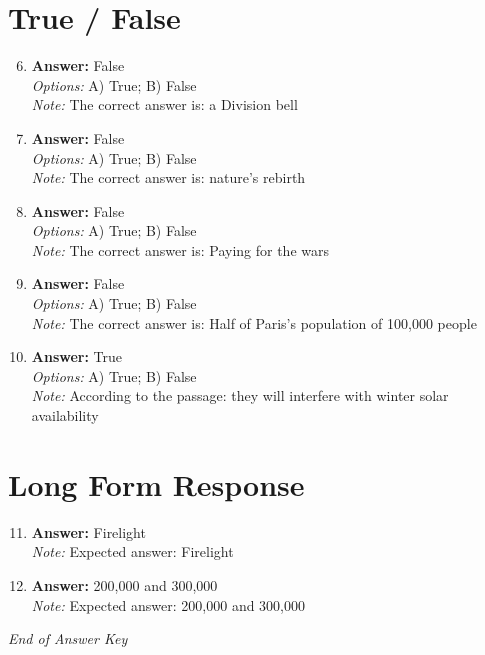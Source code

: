 \documentclass[12pt]{article}
\begin{document}
\section*{True / False}
\begin{enumerate}[label=\arabic*.]
\setcounter{enumi}{5}
\item \textbf{Answer:} False
\\ \textit{Options:} A) True; B) False
\\ \textit{Note:} The correct answer is: a Division bell
\item \textbf{Answer:} False
\\ \textit{Options:} A) True; B) False
\\ \textit{Note:} The correct answer is: nature's rebirth
\item \textbf{Answer:} False
\\ \textit{Options:} A) True; B) False
\\ \textit{Note:} The correct answer is: Paying for the wars
\item \textbf{Answer:} False
\\ \textit{Options:} A) True; B) False
\\ \textit{Note:} The correct answer is: Half of Paris's population of 100,000 people
\item \textbf{Answer:} True
\\ \textit{Options:} A) True; B) False
\\ \textit{Note:} According to the passage: they will interfere with winter solar availability
\end{enumerate}

\section*{Long Form Response}
\begin{enumerate}[label=\arabic*.]
\setcounter{enumi}{10}
\item \textbf{Answer:} Firelight
\\ \textit{Note:} Expected answer: Firelight
\item \textbf{Answer:} 200,000 and 300,000
\\ \textit{Note:} Expected answer: 200,000 and 300,000
\end{enumerate}

\vfill
\noindent\textit{End of Answer Key}
\end{document}
